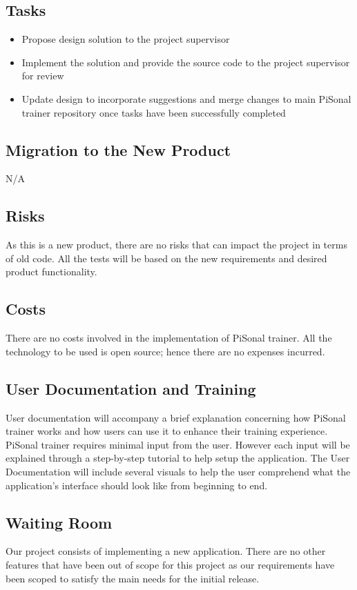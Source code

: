 \documentclass{article}
\begin{document}
\subsection{Tasks}
\begin{itemize}
    \item Propose design solution to the project supervisor
    \item Implement the solution and provide the source code to the project supervisor for review
    \item Update design to incorporate suggestions and merge changes to main PiSonal trainer repository once tasks have been successfully completed
\end{itemize}

\subsection{Migration to the New Product}
N/A

\subsection{Risks}
As this is a new product, there are no risks that can impact the project in terms of old code. All the tests will be based on the new requirements and desired  product functionality.

\subsection{Costs}
There are no costs involved in the implementation of PiSonal trainer. All the technology to be used is open source; hence there are no expenses incurred.

\subsection{User Documentation and Training}
User documentation will accompany a brief explanation concerning how PiSonal trainer works and how users can use it to enhance their training experience. PiSonal trainer requires minimal input from the user. However each input will be explained through a step-by-step tutorial to help setup the application. The User Documentation will include several visuals to help the user comprehend what the application's interface should look like from beginning to end. 

\subsection{Waiting Room}
Our project consists of implementing a new application. There are no other features that have been out of scope for this project as our requirements have been scoped to satisfy the main needs for the initial release. 


\end{document}
